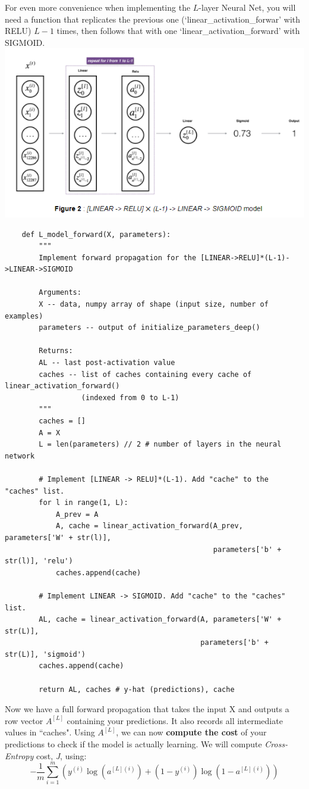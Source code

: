 \documentclass[11pt, a4paper]{article}
\begin{document}
\begin{spacing}{1.1}
	\noindent For even more convenience when implementing the $L$-layer Neural Net, you will need a function that replicates the previous one (`linear\_activation\_forwar' with RELU) $L-1$ times, then follows that with one `linear\_activation\_forward' with SIGMOID. \\
	\hspace*{30mm} \includegraphics[scale=0.7]{deep_forward_model}
	\begin{lstlisting}
	def L_model_forward(X, parameters):
		"""
		Implement forward propagation for the [LINEAR->RELU]*(L-1)->LINEAR->SIGMOID
		
		Arguments:
		X -- data, numpy array of shape (input size, number of examples)
		parameters -- output of initialize_parameters_deep()
		
		Returns:
		AL -- last post-activation value
		caches -- list of caches containing every cache of linear_activation_forward() 
		          (indexed from 0 to L-1)
		"""
		caches = []
		A = X
		L = len(parameters) // 2 # number of layers in the neural network
		
		# Implement [LINEAR -> RELU]*(L-1). Add "cache" to the "caches" list.
		for l in range(1, L):
			A_prev = A 
			A, cache = linear_activation_forward(A_prev, parameters['W' + str(l)], 
			                                     parameters['b' + str(l)], 'relu')
			caches.append(cache)
		
		# Implement LINEAR -> SIGMOID. Add "cache" to the "caches" list.
		AL, cache = linear_activation_forward(A, parameters['W' + str(L)], 
		                                      parameters['b' + str(L)], 'sigmoid')
		caches.append(cache)
		
		return AL, caches # y-hat (predictions), cache \end{lstlisting} \vspace*{1mm}
	Now we have a full forward propagation that takes the input X and outputs a row vector $A^{[L]}$ containing your predictions. It also records all intermediate values in ``caches". Using $A^{[L]}$, we can now \textbf{compute the cost} of your predictions to check if the model is actually learning. We will compute \textit{Cross-Entropy} cost, \textit{J}, using: $$-\frac{1}{m} \sum\limits_{i = 1}^{m} (y^{(i)}\log\left(a^{[L] (i)}\right) + (1-y^{(i)})\log\left(1- a^{[L](i)}\right))$$ \newpage


\end{spacing}
\end{document}
